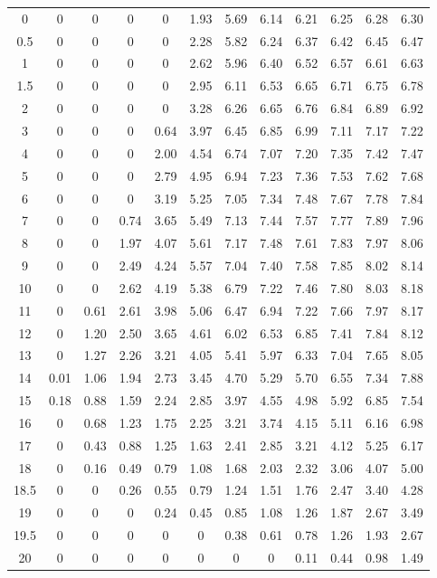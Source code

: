 \documentclass[12pt,a4paper,twoside]{report}
\begin{document}
\begin{table}[H]
{\begin{tabular}{c|ccccccccccc}
0    & 0 & 0 & 0 & 0 & 1.93 & 5.69 & 6.14 & 6.21 & 6.25 & 6.28 & 6.30 \\
0.5  & 0 & 0 & 0 & 0 & 2.28 & 5.82 & 6.24 & 6.37 & 6.42 & 6.45 & 6.47 \\
1    & 0 & 0 & 0 & 0 & 2.62 & 5.96 & 6.40 & 6.52 & 6.57 & 6.61 & 6.63 \\
1.5  & 0 & 0 & 0 & 0 & 2.95 & 6.11 & 6.53 & 6.65 & 6.71 & 6.75 & 6.78 \\
2    & 0 & 0 & 0 & 0 & 3.28 & 6.26 & 6.65 & 6.76 & 6.84 & 6.89 & 6.92 \\
3    & 0 & 0 & 0 & 0.64 & 3.97 & 6.45 & 6.85 & 6.99 & 7.11 & 7.17 & 7.22 \\
4    & 0 & 0 & 0 & 2.00 & 4.54 & 6.74 & 7.07 & 7.20 & 7.35 & 7.42 & 7.47 \\
5    & 0 & 0 & 0 & 2.79 & 4.95 & 6.94 & 7.23 & 7.36 & 7.53 & 7.62 & 7.68 \\
6    & 0 & 0 & 0 & 3.19 & 5.25 & 7.05 & 7.34 & 7.48 & 7.67 & 7.78 & 7.84 \\
7    & 0 & 0 & 0.74 & 3.65 & 5.49 & 7.13 & 7.44 & 7.57 & 7.77 & 7.89 & 7.96 \\
8    & 0 & 0 & 1.97 & 4.07 & 5.61 & 7.17 & 7.48 & 7.61 & 7.83 & 7.97 & 8.06 \\
9    & 0 & 0 & 2.49 & 4.24 & 5.57 & 7.04 & 7.40 & 7.58 & 7.85 & 8.02 & 8.14 \\
10   & 0 & 0 & 2.62 & 4.19 & 5.38 & 6.79 & 7.22 & 7.46 & 7.80 & 8.03 & 8.18 \\
11   & 0 & 0.61 & 2.61 & 3.98 & 5.06 & 6.47 & 6.94 & 7.22 & 7.66 & 7.97 & 8.17 \\
12   & 0 & 1.20 & 2.50 & 3.65 & 4.61 & 6.02 & 6.53 & 6.85 & 7.41 & 7.84 & 8.12 \\
13   & 0 & 1.27 & 2.26 & 3.21 & 4.05 & 5.41 & 5.97 & 6.33 & 7.04 & 7.65 & 8.05 \\
14   & 0.01 & 1.06 & 1.94 & 2.73 & 3.45 & 4.70 & 5.29 & 5.70 & 6.55 & 7.34 & 7.88 \\
15   & 0.18 & 0.88 & 1.59 & 2.24 & 2.85 & 3.97 & 4.55 & 4.98 & 5.92 & 6.85 & 7.54 \\
16   & 0 & 0.68 & 1.23 & 1.75 & 2.25 & 3.21 & 3.74 & 4.15 & 5.11 & 6.16 & 6.98 \\
17   & 0 & 0.43 & 0.88 & 1.25 & 1.63 & 2.41 & 2.85 & 3.21 & 4.12 & 5.25 & 6.17 \\
18   & 0 & 0.16 & 0.49 & 0.79 & 1.08 & 1.68 & 2.03 & 2.32 & 3.06 & 4.07 & 5.00 \\
18.5 & 0 & 0 & 0.26 & 0.55 & 0.79 & 1.24 & 1.51 & 1.76 & 2.47 & 3.40 & 4.28 \\
19   & 0 & 0 & 0 & 0.24 & 0.45 & 0.85 & 1.08 & 1.26 & 1.87 & 2.67 & 3.49 \\
19.5 & 0 & 0 & 0 & 0 & 0 & 0.38 & 0.61 & 0.78 & 1.26 & 1.93 & 2.67 \\
20   & 0 & 0 & 0 & 0 & 0 & 0 & 0 & 0.11 & 0.44 & 0.98 & 1.49 \\

\bottomrule
\end{tabular}%
}
\end{table}
\end{document}
